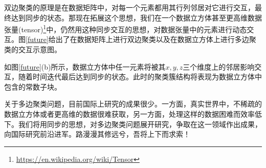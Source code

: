 双边聚类的原理是在数据矩阵中，对每一个元素都用其行列邻居对它进行交互，最终达到同步的状态。那现在拓展这个思想，我们在一个数据立方体甚至更高维数据张量(tensor)\footnote{\url{https://en.wikipedia.org/wiki/Tensor}}中，仍然用这种同步交互的思想，对数据张量中的元素进行动态交互。图\ref{future}给出了在数据矩阵上进行双边聚类以及在数据立方体上进行多边聚类的交互示意图。


如图\ref{future}(b)所示，数据立方体中任一元素将被其$x,y,z$三个维度上的邻居影响交互，随着时间迭代最后达到同步的状态。此时的聚类簇结构将表现为数据立方体中包含的常数子块。

关于多边聚类问题，目前国际上研究的成果很少。一方面，真实世界中，不稀疏的数据立方体或者更高维的数据很难获取，另一方面，处理这样的数据困难而效率低下。我们将用同步的思想，对多边聚类问题展开研究，争取在这一领域作出成果，向国际研究前沿进军。路漫漫其修远兮，吾将上下而求索！


